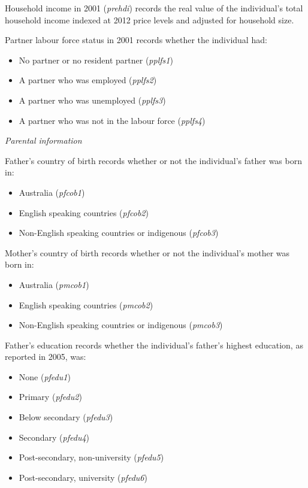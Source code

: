 \documentclass[12pt, a4paper]{article}
\begin{document}
Household income in 2001 (\textit{p\textunderscore{}rehdi}) records the real value of the individual’s total household income indexed at 2012 price levels and adjusted for household size.
 
Partner labour force status in 2001 records whether the individual had:
\begin{itemize}
  \item No partner or no resident partner (\textit{p\textunderscore{}plfs1})
  \item A partner who was employed (\textit{p\textunderscore{}plfs2})
  \item A partner who was unemployed (\textit{p\textunderscore{}plfs3})
  \item A partner who was not in the labour force (\textit{p\textunderscore{}plfs4})
\end{itemize}  
  
\emph{Parental information}

Father’s country of birth records whether or not the individual’s father was born in:
\begin{itemize}
  \item Australia (\textit{p\textunderscore{}fcob1}) 
  \item English speaking countries (\textit{p\textunderscore{}fcob2})
  \item Non-English speaking countries or indigenous (\textit{p\textunderscore{}fcob3})
\end{itemize}  
 
Mother’s country of birth records whether or not the individual’s mother was born in:
\begin{itemize}
  \item Australia (\textit{p\textunderscore{}mcob1}) 
  \item English speaking countries (\textit{p\textunderscore{}mcob2})
  \item Non-English speaking countries or indigenous (\textit{p\textunderscore{}mcob3})
\end{itemize}  
 
Father’s education records whether the individual’s father’s highest education, as reported in 2005, was:
\begin{itemize}
  \item None (\textit{p\textunderscore{}fedu1})
  \item Primary (\textit{p\textunderscore{}fedu2})
  \item Below secondary (\textit{p\textunderscore{}fedu3})
  \item Secondary (\textit{p\textunderscore{}fedu4})
  \item Post-secondary, non-university (\textit{p\textunderscore{}fedu5})
  \item Post-secondary, university (\textit{p\textunderscore{}fedu6}) 
\end{itemize}
 
\end{document}
